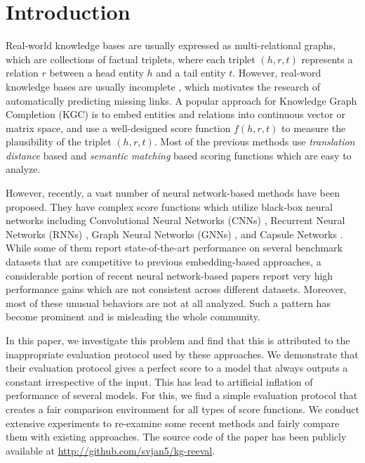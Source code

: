 \documentclass[11pt,a4paper]{article}
\begin{document}
\section{Introduction}
\label{sec:intro}

Real-world knowledge bases are usually expressed as multi-relational graphs, which are collections of factual triplets, where each triplet $(h, r, t)$ represents a relation $r$ between a head entity $h$ and a tail entity $t$.
However, real-word knowledge bases are usually incomplete \cite{kg_incomp1}, which motivates the research of automatically predicting missing links.
A popular approach for Knowledge Graph Completion (KGC) is to embed entities and relations into continuous vector or matrix space, and use a well-designed score function $f(h, r, t)$ to measure the plausibility of the triplet $(h, r, t)$.
Most of the previous methods use \textit{translation distance} based \cite{transe,transh,transg,rotate} and \textit{semantic matching} based \cite{rescal2013,distmult,hole,complex,analogy} scoring functions which are easy to analyze. 

However, recently, a vast number of neural network-based methods have been proposed. They have complex score functions which utilize black-box neural networks including Convolutional Neural Networks (CNNs) \cite{conve,convkb}, Recurrent Neural Networks (RNNs) \cite{ptranse,dolores}, Graph Neural Networks (GNNs) \cite{r_gcn,sacn_paper}, and Capsule Networks \cite{capse}. While some of them report state-of-the-art performance on several benchmark datasets that are competitive to previous embedding-based approaches, a considerable portion of recent neural network-based papers report very high performance gains which are not consistent across different datasets. Moreover, most of these unusual behaviors are not at all analyzed. Such a pattern has become prominent and is misleading the whole community.



In this paper, we investigate this problem and find that this is attributed to the inappropriate evaluation protocol used by these approaches. 
We demonstrate that their evaluation protocol gives a perfect score to a model that always outputs a constant irrespective of the input. This has lead to artificial inflation of performance of several models. 
For this, we find a simple evaluation protocol that creates a fair comparison environment for all types of score functions. We conduct extensive experiments to re-examine some recent methods and fairly compare them with existing approaches. The source code of the paper has been publicly available at \url{http://github.com/svjan5/kg-reeval}.
\end{document}
